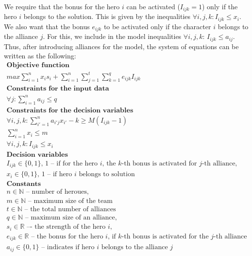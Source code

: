 \documentclass[smallextended]{svjour3}       %
\begin{document}
We require that the bonus for the hero $i$ can be activated ($ I_{ijk} = 1 $) only if the hero $i$ belongs to the solution. This is given by the inequalities $ \forall {i, j, k}: I_{ijk} \le x_i $. We also want that the bonus $ e_{ijk} $ to be activated only if the character $ i $ belongs to the alliance $j$. For this, we include in the model inequalities $ \forall{i, j, k} :\, I_{ijk} \le a_{ij} $.\\
Thus, after introducing alliances for the model, the system of equations can be written as the following:
\begin{equation}
\label{eq:DUIP}
\begin{gathered}
\textbf{Objective function}\\
max \sum_{i=1}^{n} x_i s_i + \sum_{i=1}^{n} \sum_{j=1}^{t}  \sum_{k=1}^{q} e_{ijk} I_{ijk} \\
\textbf{Constraints for the input data}\\
\forall{j} : \sum_{i=1}^n a_{ij} \le q \\
\textbf{Constraints for the decision variables} \\
\forall{i,j,k} :  \sum_{i'=1}^{n} a_{i'j} x_{i'} - k \ge M( I_{ijk}  - 1) \\
\sum_{i=1}^n x_i \le m   \\
\forall{i,j,k} :  I_{ijk}  \le x_i \\
\textbf{Decision variables} \\
I_{ijk} \in \{0, 1\} \text {, 1 – if for the hero } i \text{, the } k\text{-th bonus is activated for }  j \text{-th alliance,} \\
x_i  \in \{0, 1\} \text{, 1 -- if hero } i \text{ belongs to solution} \\
\textbf{Constants} \\
n \in \mathbb{N} \text{ -- number of heroues,} \\
m \in \mathbb{N} \text{ -- maximum size of the team}\\
t \in \mathbb{N} \text{ -- the total number of alliances} \\
q \in \mathbb{N} \text{ -- maximum size of an alliance,} \\
s_i  \in \mathbb{R} \text{ –- the strength of the hero } i, \\
e_{ijk} \in \mathbb{R} \text{ -- the bonus for the hero } i \text{,  if } k
\text{-th bonus is activated for the } j \text{-th alliance} \\
a_{ij} \in \{0, 1\} \text{ -- indicates if hero } i \text{ belongs to the alliance } j \\
\end{gathered}
\end{equation}
\end{document}
